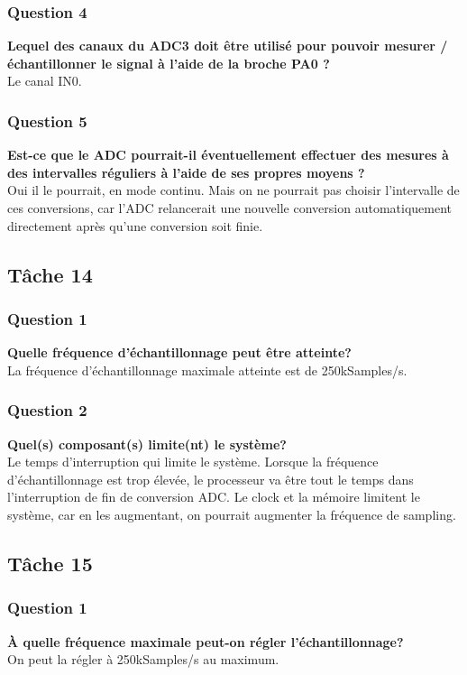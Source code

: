 \documentclass[12pt]{article}
\begin{document}
	\subsubsection{Question 4}
	\textbf{Lequel des canaux du ADC3 doit être utilisé pour pouvoir mesurer / échantillonner le signal à l'aide de la broche PA0 ?}\\
	Le canal IN0.
	\subsubsection{Question 5}
	\textbf{Est-ce que le ADC pourrait-il éventuellement effectuer des mesures à des intervalles réguliers à l'aide de ses propres moyens ?}\\	
	Oui il le pourrait, en mode continu. Mais on ne pourrait pas choisir l'intervalle de ces conversions, car l'ADC relancerait une nouvelle conversion automatiquement directement après qu'une conversion soit finie.
	\subsection{Tâche 14}
	\subsubsection{Question 1}
	\textbf{Quelle fréquence d’échantillonnage peut être atteinte?}\\
	La fréquence d'échantillonnage maximale atteinte est de 250kSamples/s.
	\subsubsection{Question 2}
	\textbf{Quel(s) composant(s) limite(nt) le système?}\\
	Le temps d'interruption qui limite le système. Lorsque la fréquence d'échantillonnage est trop élevée, le processeur va être tout le temps dans l'interruption de fin de conversion ADC. Le clock et la mémoire limitent le système, car en les augmentant, on pourrait augmenter la fréquence de sampling.
	
	\subsection{Tâche 15}
	\subsubsection{Question 1}
	\textbf{À quelle fréquence maximale peut-on régler l’échantillonnage?}\\
	On peut la régler à 250kSamples/s au maximum.
\end{document}
